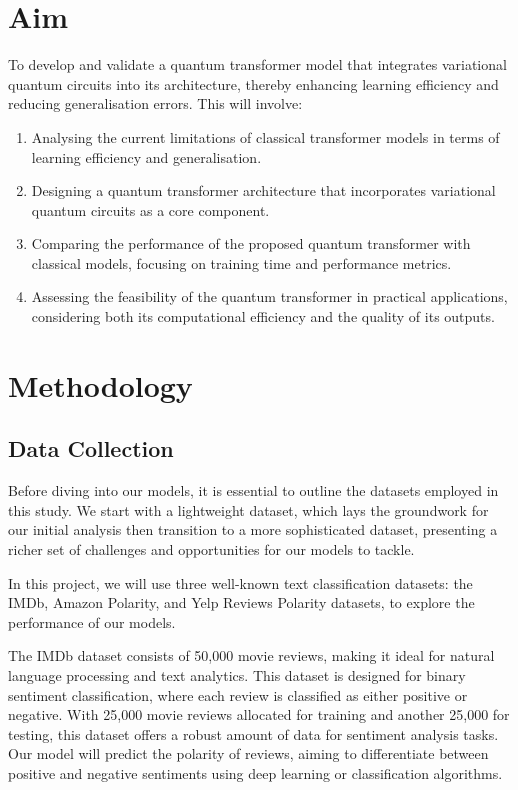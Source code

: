 \section{Aim}
\label{sec:aim}
To develop and validate a quantum transformer model that integrates
variational quantum circuits into its architecture, thereby enhancing
learning efficiency and reducing generalisation errors. This will involve:

\begin{enumerate}
    \setlength{
  \itemsep}{-1ex}
  \item Analysing the current limitations of classical transformer
    models in terms of learning efficiency and generalisation.
  \item Designing a quantum transformer architecture that
    incorporates variational quantum circuits as a core component.
  \item Comparing the performance of the proposed quantum transformer
    with classical models, focusing on training time and performance metrics.
  \item Assessing the feasibility of the quantum transformer in
    practical applications, considering both its computational
    efficiency and the quality of its outputs.
\end{enumerate}

\section{Methodology}
\label{sec:methodology}
\subsection{Data Collection}
\label{subsec:data_collection}

Before diving into our models, it is essential to outline the
datasets employed in this study. We start with a lightweight dataset,
which lays the groundwork for our initial analysis then transition to
a more sophisticated dataset, presenting a richer set of challenges
and opportunities for our models to tackle.

In this project, we will use three well-known text classification
datasets: the IMDb, Amazon Polarity, and Yelp Reviews Polarity
datasets, to explore the performance of our models.

The IMDb dataset consists of 50,000 movie reviews, making it ideal
for natural language processing and text analytics. This dataset is
designed for binary sentiment classification, where each review is
classified as either positive or negative. With 25,000 movie reviews
allocated for training and another 25,000 for testing, this dataset
offers a robust amount of data for sentiment analysis tasks. Our
model will predict the polarity of reviews, aiming to differentiate
between positive and negative sentiments using deep learning or
classification algorithms.

